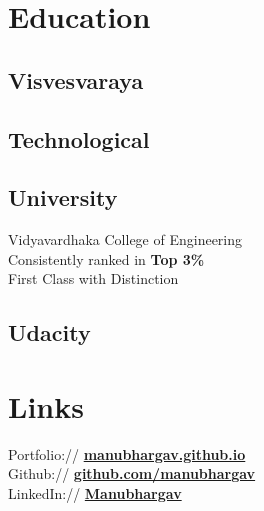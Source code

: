 \documentclass[]{deedy-resume-openfont}
\begin{document}
%
%
\lastupdated

%
%

%
%

\begin{minipage}[t]{0.33\textwidth} 


\section{Education} 
\subsection{Visvesvaraya} 
\subsection{Technological} 
\subsection{University }
Vidyavardhaka College of Engineering \\ 
Consistently ranked in \textbf{Top 3\%} \\
First Class with Distinction\\
\sectionsep

\subsection{Udacity}
\sectionsep


\section{Links} 
Portfolio:// \href{https://manubhargav.github.io}{\bf manubhargav.github.io} \\
Github:// \href{https://github.com/manubhargav}{\bf github.com/manubhargav} \\
LinkedIn://  \href{https://www.linkedin.com/in/manubhargav}{\bf Manubhargav}


\end{minipage}
\end{document}
